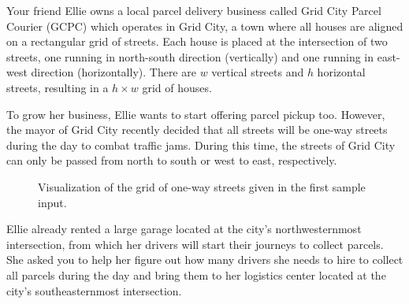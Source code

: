 
Your friend Ellie owns a local parcel delivery business called Grid City 
Parcel Courier (GCPC) which operates in Grid City, a town where all houses are
aligned on a rectangular grid of streets. Each house is placed at the intersection
of two streets, one running in north-south direction (vertically) and one
running in east-west direction (horizontally). There are $w$ vertical streets and
$h$ horizontal streets, resulting in a $h\times w$ grid of houses.

To grow her business, Ellie wants to start offering parcel pickup too.
However, the mayor of Grid City recently decided that all streets will 
be one-way streets during the day to combat traffic jams. During this time,
the streets of Grid City can only be passed from north to south or west to
east, respectively.

\begin{figure}[!h]
  \centering
	\caption{Visualization of the grid of one-way streets given in the first sample input.}
\end{figure}

Ellie already rented a large garage located at the city's northwesternmost
intersection, from which her drivers will start their journeys to collect
parcels. She asked you to help her figure out how many drivers she needs to
hire to collect all parcels during the day and bring them to her logistics
center located at the city's southeasternmost intersection.

